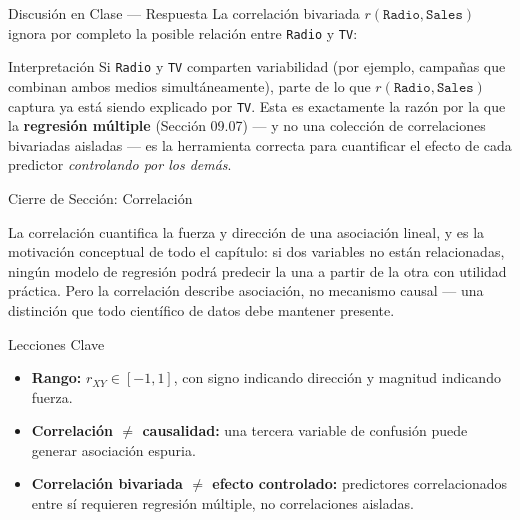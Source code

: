 \documentclass[10pt, aspectratio=169]{beamer}
\begin{document}
\begin{frame}{Discusión en Clase --- Respuesta}
  \scriptsize
  La correlación bivariada $r(\texttt{Radio},\texttt{Sales})$ ignora por completo la posible relación entre \texttt{Radio} y \texttt{TV}: \pause

  \vspace{0.1cm}
  \begin{alertblock}{Interpretación}
    Si \texttt{Radio} y \texttt{TV} comparten variabilidad (por ejemplo, campañas que combinan ambos medios simultáneamente), parte de lo que $r(\texttt{Radio},\texttt{Sales})$ captura ya está siendo explicado por \texttt{TV}. Esta es exactamente la razón por la que la \textbf{regresión múltiple} (Sección 09.07) --- y no una colección de correlaciones bivariadas aisladas --- es la herramienta correcta para cuantificar el efecto de cada predictor \emph{controlando por los demás}.
  \end{alertblock}
\end{frame}

\begin{frame}{Cierre de Sección: Correlación}
  \begin{reflexion}
    La correlación cuantifica la fuerza y dirección de una asociación lineal, y es la motivación conceptual de todo el capítulo: si dos variables no están relacionadas, ningún modelo de regresión podrá predecir la una a partir de la otra con utilidad práctica. Pero la correlación describe asociación, no mecanismo causal --- una distinción que todo científico de datos debe mantener presente.
  \end{reflexion}

  \vspace{0.2cm}
  \pause
  \begin{block}{Lecciones Clave}
    \begin{itemize}\itemsep=0.08cm
      \item \textbf{Rango:} $r_{XY}\in[-1,1]$, con signo indicando dirección y magnitud indicando fuerza.
      \item \textbf{Correlación $\neq$ causalidad:} una tercera variable de confusión puede generar asociación espuria.
      \item \textbf{Correlación bivariada $\neq$ efecto controlado:} predictores correlacionados entre sí requieren regresión múltiple, no correlaciones aisladas.
    \end{itemize}
  \end{block}
\end{frame}
\end{document}
